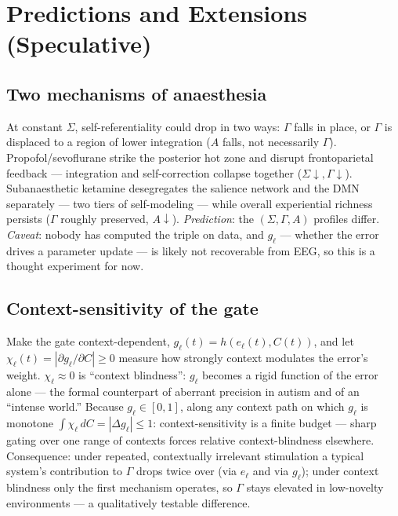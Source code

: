 \documentclass[11pt]{article}
\begin{document}
\section{Predictions and Extensions (Speculative)}\label{sec:speculative}

\subsection{Two mechanisms of anaesthesia}
At constant $\Sigma$, self-referentiality could drop in two ways: $\Gamma$ falls in place, or $\Gamma$ is displaced to a region of lower integration ($A$ falls, not necessarily $\Gamma$). Propofol/sevoflurane strike the posterior hot zone \cite{hotzone2021} and disrupt frontoparietal feedback \cite{lee2013disruption} --- integration and self-correction collapse together ($\Sigma\downarrow,\Gamma\downarrow$). Subanaesthetic ketamine desegregates the salience network and the DMN separately \cite{ketaminemodel2022} --- two tiers of self-modeling --- while overall experiential richness persists ($\Gamma$ roughly preserved, $A\downarrow$). \emph{Prediction}: the $(\Sigma,\Gamma,A)$ profiles differ. \emph{Caveat}: nobody has computed the triple on data, and $g_\ell$ --- whether the error drives a parameter update --- is likely not recoverable from EEG, so this is a thought experiment for now.

\subsection{Context-sensitivity of the gate}
Make the gate context-dependent, $g_\ell(t)=h(e_\ell(t),C(t))$, and let $\chi_\ell(t)=|\partial g_\ell/\partial C|\ge0$ measure how strongly context modulates the error's weight. $\chi_\ell\approx0$ is ``context blindness'': $g_\ell$ becomes a rigid function of the error alone --- the formal counterpart of aberrant precision in autism \cite{vandecruys2014,qela2025} and of an ``intense world.'' Because $g_\ell\in[0,1]$, along any context path on which $g_\ell$ is monotone $\int\chi_\ell\,dC=|\Delta g_\ell|\le1$: context-sensitivity is a finite budget --- sharp gating over one range of contexts forces relative context-blindness elsewhere. Consequence: under repeated, contextually irrelevant stimulation a typical system's contribution to $\Gamma$ drops twice over (via $e_\ell$ and via $g_\ell$); under context blindness only the first mechanism operates, so $\Gamma$ stays elevated in low-novelty environments --- a qualitatively testable difference.
\end{document}
